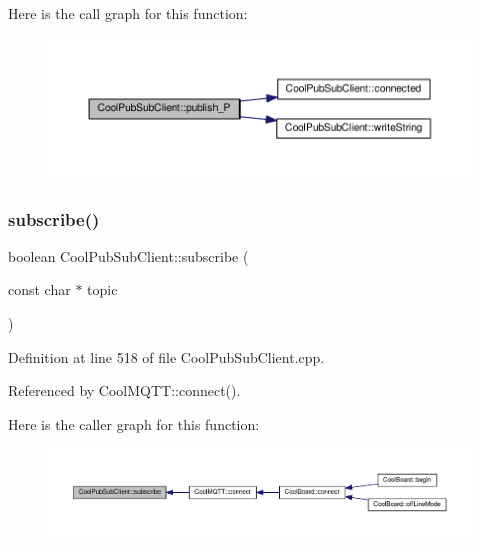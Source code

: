Here is the call graph for this function\+:
\nopagebreak
\begin{figure}[H]
\begin{center}
\leavevmode
\includegraphics[width=350pt]{d8/d4b/class_cool_pub_sub_client_a55458d47cf01f590e9b6647d5a418ab6_cgraph}
\end{center}
\end{figure}
\mbox{\label{class_cool_pub_sub_client_ac1ebc9ad874128aefa985d78496d2e8f}} 
\subsubsection{\texorpdfstring{subscribe()}{subscribe()}\hspace{0.1cm}{\footnotesize\ttfamily [1/2]}}
{\footnotesize\ttfamily boolean Cool\+Pub\+Sub\+Client\+::subscribe (\begin{DoxyParamCaption}\item[{const char $\ast$}]{topic }\end{DoxyParamCaption})}



Definition at line 518 of file Cool\+Pub\+Sub\+Client.\+cpp.



Referenced by Cool\+M\+Q\+T\+T\+::connect().

Here is the caller graph for this function\+:
\nopagebreak
\begin{figure}[H]
\begin{center}
\leavevmode
\includegraphics[width=350pt]{d8/d4b/class_cool_pub_sub_client_ac1ebc9ad874128aefa985d78496d2e8f_icgraph}
\end{center}
\end{figure}
\mbox{\label{class_cool_pub_sub_client_aebf684e98588c52a72af1014f7957bee}} 
